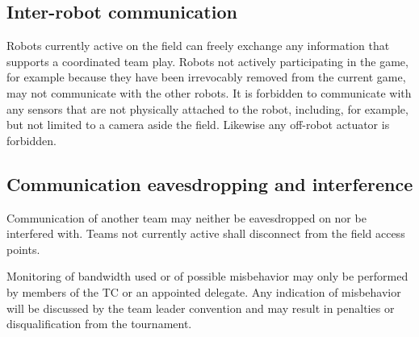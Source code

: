 \documentclass[12pt,twoside]{article}
\newenvironment{rulechange}{}{}
\begin{document}
\subsection{Inter-robot communication}
\label{sec:inter-robot-comm}
Robots currently active on the field can freely exchange any
information that supports a coordinated team play. Robots not actively
participating in the game, for example because they have been
irrevocably removed from the current game, may not communicate with
the other robots. It is forbidden to communicate with any sensors that
are not physically attached to the robot, including, for example, but
not limited to a camera aside the field. Likewise any off-robot
actuator is forbidden.

\subsection{Communication eavesdropping and interference}
\label{sec:comm-tampering}
Communication of another team may neither be eavesdropped on nor be
interfered with. Teams not currently active shall disconnect from the
field access points.

Monitoring of bandwidth used or of possible misbehavior may only be
performed by members of the TC or an appointed delegate.
Any indication of misbehavior will be discussed by the team leader
convention and may result in penalties or disqualification from the
tournament.


\end{document}
